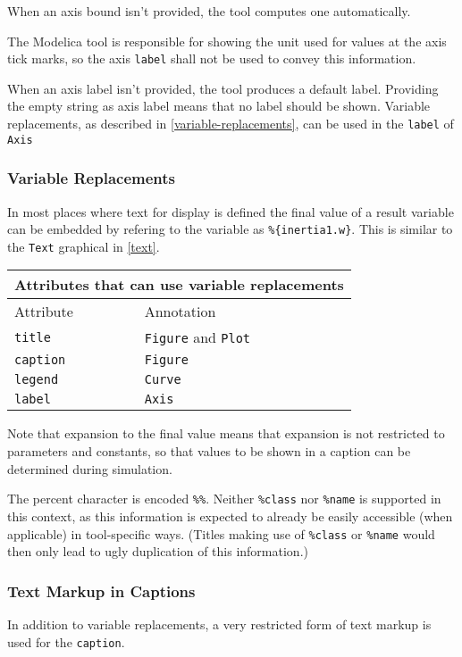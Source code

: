When an axis bound isn't provided, the tool computes one automatically.

The Modelica tool is responsible for showing the unit used for values at the
axis tick marks, so the axis \lstinline!label! shall not be used to convey this
information.

When an axis label isn't provided, the tool produces a default label. Providing
the empty string as axis label means that no label should be shown. Variable
replacements, as described in \autoref{variable-replacements}, can be used in
the \lstinline!label! of \lstinline!Axis!

\subsubsection{Variable Replacements}
In most places where text for display is defined the final value of a result
variable can be embedded by refering to the variable as
\lstinline!%{inertia1.w}!.  This is similar to the \lstinline!Text! graphical in
\autoref{text}.

\begin{longtable}[]{|l|l|}
\hline
\multicolumn{2}{|l|}{Attributes that can use variable replacements}\\ \hline
Attribute & Annotation \\ \hline
\lstinline!title! & \lstinline!Figure! and \lstinline!Plot! \\ \hline
\lstinline!caption! & \lstinline!Figure! \\ \hline
\lstinline!legend! & \lstinline!Curve! \\ \hline
\lstinline!label! & \lstinline!Axis! \\ \hline
\end{longtable}

Note that expansion to the final value means that expansion is not restricted to
parameters and constants, so that values to be shown in a caption can be
determined during simulation.

The percent character is encoded \lstinline!%%!.  Neither \lstinline!%class! nor
\lstinline!%name! is supported in this context, as this information is expected
to already be easily accessible (when applicable) in tool-specific ways. (Titles
making use of \lstinline!%class! or \lstinline!%name! would then only lead to
ugly duplication of this information.)

\subsubsection{Text Markup in Captions}
In addition to variable replacements, a very restricted form of text markup is
used for the \lstinline!caption!.

